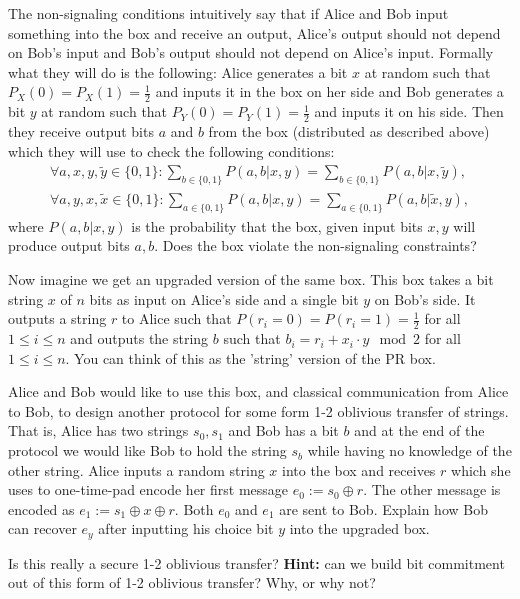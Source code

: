 \documentclass[a4paper,10pt,landscape,twocolumn]{scrartcl}
\begin{document}
\begin{exercise}
\begin{subex}
The non-signaling conditions intuitively say that if Alice and Bob input something into the box and receive an output, Alice's output should not depend on Bob's input and Bob's output should not depend on Alice's input. Formally what they will do is the following: Alice generates a bit $x$ at random such that $P_X(0)=P_X(1)=\frac12$ and inputs it in the box on her side and Bob generates a bit $y$ at random such that $P_Y(0)=P_Y(1)=\frac12$ and inputs it on his side. Then they receive output bits $a$ and $b$ from the box (distributed as described above) which they will use to check the following conditions:
\begin{align*}
\forall a,x,y,\tilde{y} \in \{0,1\}: \sum_{b \in \{0,1\}} P(a,b|x,y)= \sum_{b \in \{0,1\}} P(a,b|x,\tilde{y}), \\
\forall a,y,x,\tilde{x} \in \{0,1\}: \sum_{a \in \{0,1\}} P(a,b|x,y)= \sum_{a \in \{0,1\}} P(a,b|\tilde{x},y),
\end{align*}
where $P(a,b|x,y)$ is the probability that the box, given input bits $x,y$ will produce output bits $a,b$. Does the box violate the non-signaling constraints?
\end{subex}

\begin{subex}
Now imagine we get an upgraded version of the same box. This box takes a bit string $x$ of $n$ bits as input on Alice's side and a single bit $y$ on Bob's side. It outputs a string $r$ to Alice such that $P(r_i=0)=P(r_i=1)=\frac12$ for all $1\leq i \leq n$ and outputs the string $b$ such that $b_i=r_i+x_i \cdot y \mod 2$ for all $1 \leq i \leq n$. You can think of this as the 'string' version of the PR box.

Alice and Bob would like to use this box, and classical communication from Alice to Bob, to design another protocol for some form 1-2 oblivious transfer of strings. That is, Alice has two strings $s_0,s_1$ and Bob has a bit $b$ and at the end of the protocol we would like Bob to hold the string $s_b$ while having no knowledge of the other string. Alice inputs a random string $x$ into the box and receives $r$ which she uses to one-time-pad encode her first message $e_0 := s_0 \oplus r$. The other message is encoded as $e_1 := s_1 \oplus x \oplus r$. Both $e_0$ and $e_1$ are sent to Bob. Explain how Bob can recover $e_y$ after inputting his choice bit $y$ into the upgraded box.

Is this really a secure 1-2 oblivious transfer? 
\textbf{Hint: } can we build bit commitment out of this form of 1-2 oblivious transfer? Why, or why not?
\end{subex}

\end{exercise}
\end{document}
